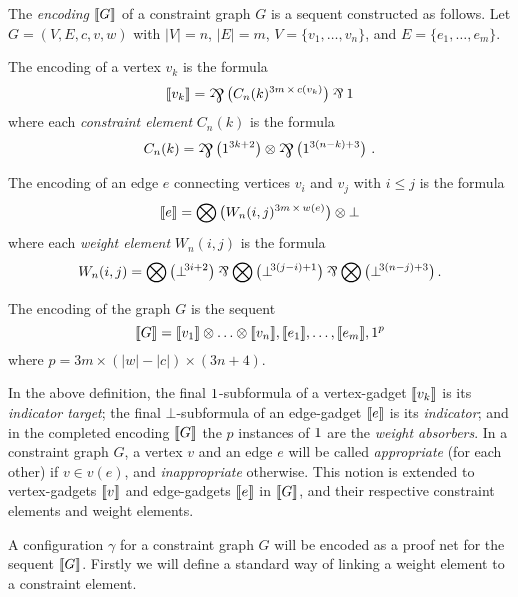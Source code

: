 \documentclass{lmcs}
\begin{document}
\begin{definition}
\label{def:graph encoding}
The \emph{encoding} $\llbracket G\rrbracket$ of a constraint graph $G$ is a sequent constructed as follows. 
Let $G=(V,E,c,v,w)$ with $|V|=n$, $|E|=m$, $V=\{v_1,\dotsc,v_n\}$, and $E=\{e_1,\dotsc,e_m\}$.

\noindent
The encoding of a vertex $v_k$ is the formula
\[
	\itn{v_k} = \bigparr\big(C_n(k)^{3m\,\times\,c(v_k)} \big)\pr\1
\]
where each \emph{constraint element} $C_n(k)$ is the formula
\[
	C_n(k) = \bigparr\big(1^{3k+2}\big) \tn \bigparr\big(1^{3(n-k)+3}\big)~.
\]

\noindent
The encoding of an edge $e$ connecting vertices $v_i$ and $v_j$ with $i\leq j$ is the formula
\[
	\llbracket e\rrbracket = \bigotimes\big(W_n(i,j)^{3m\,\times\,w(e)}\big)\otimes\bot
\]
where each \emph{weight element} $W_n(i,j)$ is the formula
\[
	W_n(i,j) = \bigtn\big(\bot\!^{3i+2}\big)\pr\bigtn\big(\bot\!^{3(j-i)+1}\big)\pr\bigtn\big(\bot\!^{3(n-j)+3}\big)\,.
\]

\noindent
The encoding of the graph $G$ is the sequent
\[
	\llbracket G\rrbracket = \llbracket v_1\rrbracket\otimes\dotso\otimes\llbracket v_n\rrbracket, \llbracket e_1\rrbracket,\dotsc,\llbracket e_m\rrbracket, 1^p
\]
where $p=3m\times(|w|-|c|)\times(3n+4)$.

\end{definition}



In the above definition, the final $1$-subformula of a vertex-gadget $\llbracket v_k\rrbracket$ is its \emph{indicator target}; the final $\bot$-subformula of an edge-gadget $\llbracket e\rrbracket$ is its \emph{indicator}; and in the completed encoding $\llbracket G\rrbracket$ the $p$ instances of $1$ are the \emph{weight absorbers}.
%
In a constraint graph $G$, a vertex $v$ and an edge $e$ will be called \emph{appropriate} (for each other) if $v\in v(e)$, and \emph{inappropriate} otherwise.
%
This notion is extended to vertex-gadgets $\llbracket v\rrbracket$ and edge-gadgets $\llbracket e\rrbracket$ in $\llbracket G\rrbracket$, and their respective constraint elements and weight elements.



A configuration $\gamma$ for a constraint graph $G$ will be encoded as a proof net for the sequent $\llbracket G\rrbracket$.
%
Firstly we will define a standard way of linking a weight element to a constraint element.
\end{document}
